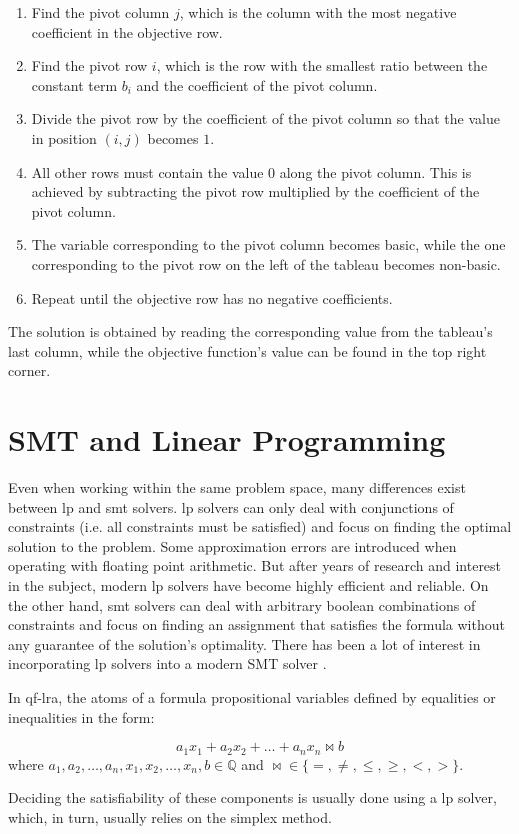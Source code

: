 \begin{enumerate}
    \item Find the pivot column $j$, which is the column with the most negative coefficient in the objective row.
    \item Find the pivot row $i$, which is the row with the smallest ratio between the constant term $b_i$ and the coefficient of the pivot column.
    \item Divide the pivot row by the coefficient of the pivot column so that the value in position $(i, j)$ becomes $1$.
    \item All other rows must contain the value $0$ along the pivot column. This is achieved by subtracting the pivot row multiplied by the coefficient of the pivot column.
    \item The variable corresponding to the pivot column becomes basic, while the one corresponding to the pivot row on the left of the tableau becomes non-basic.
    \item Repeat until the objective row has no negative coefficients.
\end{enumerate}

The solution is obtained by reading the corresponding value from the tableau's last column, while the objective function's value can be found in the top right corner.

\section{SMT and Linear Programming}

Even when working within the same problem space, many differences exist between \gls{lp} and \gls{smt} solvers.
\gls{lp} solvers can only deal with conjunctions of constraints (i.e. all constraints must be satisfied) and focus on finding the optimal solution to the problem.
Some approximation errors are introduced when operating with floating point arithmetic.
But after years of research and interest in the subject, modern \gls{lp} solvers have become highly efficient and reliable.
On the other hand, \gls{smt} solvers can deal with arbitrary boolean combinations of constraints and focus on finding an assignment that satisfies the formula without any guarantee of the solution's optimality.
There has been a lot of interest in incorporating \gls{lp} solvers into a modern SMT solver \cite{paper:lp-for-smt}.

In \gls{qf-lra}, the atoms of a formula propositional variables defined by equalities or inequalities in the form:

\begin{equation*}
    a_1 x_1 + a_2 x_2 + \dots + a_n x_n \bowtie b
\end{equation*}
where $a_1, a_2, \dots, a_n, x_1, x_2, \dots, x_n, b \in \mathbb{Q}$ and $\bowtie \in \{ =, \neq, \leq, \geq, <, > \}$.

Deciding the satisfiability of these components is usually done using a \gls{lp} solver, which, in turn, usually relies on the simplex method.
